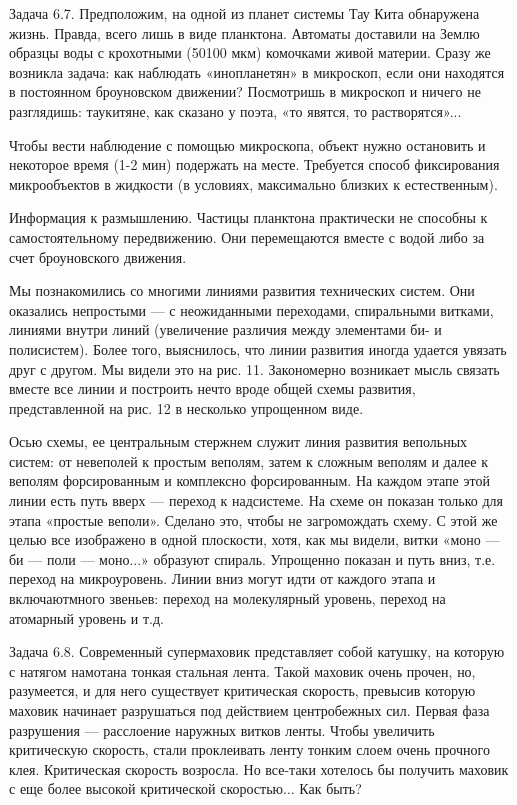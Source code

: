 Задача  6.7.  Предположим,  на  одной   из  планет  системы  Тау  Кита
обнаружена  жизнь.  Правда,  всего  лишь в  виде  планктона.  Автоматы
доставили на  Землю образцы  воды с  крохотными (50100  мкм) комочками
живой материи. Сразу же возникла задача: как наблюдать «инопланетян» в
микроскоп,  если  они  находятся в  постоянном  броуновском  движении?
Посмотришь в микроскоп и ничего  не разглядишь: таукитяне, как сказано
у поэта, «то явятся, то растворятся»...

Чтобы вести наблюдение с помощью микроскопа, объект нужно остановить и
некоторое  время  (1-2  мин)  подержать  на  месте.  Требуется  способ
фиксирования микрообъектов в жидкости (в условиях, максимально близких
к естественным).

Информация к размышлению. Частицы  планктона практически не способны к
самостоятельному передвижению. Они перемещаются вместе с водой либо за
счет броуновского движения.


Мы познакомились  со многими линиями развития  технических систем. Они
оказались непростыми — с неожиданными переходами, спиральными витками,
линиями  внутри  линий (увеличение  различия  между  элементами би-  и
полисистем). Более того, выяснилось, что линии развития иногда удается
увязать друг с другом. Мы видели это на рис. 11. Закономерно возникает
мысль связать  вместе все  линии и построить  нечто вроде  общей схемы
развития, представленной на рис. 12 в несколько упрощенном виде.

Осью схемы,  ее центральным  стержнем служит линия  развития вепольных
систем:  от невеполей  к простым  веполям, затем  к сложным  веполям и
далее к  веполям форсированным  и комплексно форсированным.  На каждом
этапе этой линии  есть путь вверх — переход к  надсистеме. На схеме он
показан  только для  этапа  «простые веполи».  Сделано  это, чтобы  не
загромождать схему. С этой же  целью все изображено в одной плоскости,
хотя,  как мы  видели, витки  «моно —  би —  поли —  моно...» образуют
спираль. Упрощенно показан и путь  вниз, т.е. переход на микроуровень.
Линии  вниз  могут идти  от  каждого  этапа и  включаютмного  звеньев:
переход на молекулярный уровень, переход на атомарный уровень и т.д.

Задача 6.8.  Современный супермаховик  представляет собой  катушку, на
которую  с  натягом  намотана  тонкая стальная  лента.  Такой  маховик
очень  прочен,  но,  разумеется,  и для  него  существует  критическая
скорость, превысив которую маховик  начинает разрушаться под действием
центробежных сил. Первая фаза  разрушения — расслоение наружных витков
ленты. Чтобы  увеличить критическую скорость, стали  проклеивать ленту
тонким слоем  очень прочного  клея. Критическая скорость  возросла. Но
все-таки хотелось бы получить маховик  с еще более высокой критической
скоростью... Как быть?


